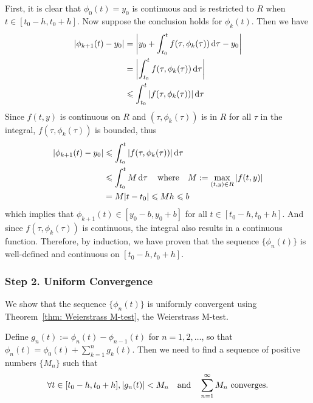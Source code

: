 \documentclass[10pt,UTF8]{article}
\theoremstyle{definition}
\newtheorem{definition inner}{Definition}[section]
\theoremstyle{definition}
\newtheorem{theorem inner}{Theorem}[section]
\theoremstyle{definition}
\newtheorem*{proof inner}{\textit{Proof}}
\theoremstyle{plain}
\newtheorem{tip inner}{Tip}[section]
\theoremstyle{remark}
\begin{document}
First, it is clear that \(\phi_0(t) = y_0\) is continuous and
is restricted to \(R\) when \(t \in [t_0 - h, t_0 + h]\).
Now suppose the conclusion holds for \(\phi_k(t)\).
Then we have
\begin{align*}
  \abs{\phi_{k+1}(t) - y_0}
  &= \abs{y_0 + \int_{t_0}^{t} f(\tau, \phi_k(\tau)) \dd{\tau} - y_0} \\
  &= \abs{\int_{t_0}^{t} f(\tau, \phi_k(\tau)) \dd{\tau}} \\
  &\leqslant \int_{t_0}^{t} \abs{f(\tau, \phi_k(\tau))} \dd{\tau}
\end{align*}
Since \(f(t,y)\) is continuous on \(R\) and
\((\tau, \phi_k(\tau))\) is in \(R\) for all \(\tau \) in the integral,
\(f(\tau, \phi_k(\tau))\) is bounded, thus
\begin{align*}
  \abs{\phi_{k+1}(t) - y_0}
  &\leqslant \int_{t_0}^{t} \abs{f(\tau, \phi_k(\tau))} \dd{\tau} \\
  &\leqslant \int_{t_0}^{t} M \dd{\tau}
  \qq{where} M := \max_{(t,y) \in R} \abs{f(t,y)} \\
  &= M|t - t_0| \leqslant M h \leqslant b
\end{align*}
which implies that \(\phi_{k+1}(t) \in [y_0 - b, y_0 + b]\)
for all \(t \in [t_0 - h, t_0 + h]\).
And since \(f(\tau, \phi_k(\tau))\) is continuous,
the integral also results in a continuous function.
Therefore, by induction, we have proven that the sequence
\( \{\phi_n(t)\} \) is well-defined and continuous on \([t_0 - h, t_0 + h]\).

\subsubsection*{Step 2. Uniform Convergence}

We show that the sequence \( \{\phi_n(t)\} \) is uniformly convergent
using Theorem~\ref{thm: Weierstrass M-test}, the Weierstrass M-test.

Define \(g_n(t) := \phi_n(t) - \phi_{n-1}(t)\) for \(n = 1, 2, \dots \),
so that \(\displaystyle\phi_n(t) = \phi_0(t) + \sum_{k=1}^{n} g_k(t)\).
Then we need to find a sequence of positive numbers \( \{M_n\} \) such that
\begin{equation*}
  \forall t \in [t_0 - h, t_0 + h], \abs{g_n(t)} < M_n
  \qand \sum_{n=1}^{\infty} M_n \text{ converges.}
\end{equation*}
\end{document}
